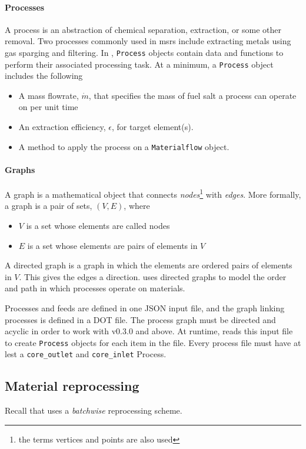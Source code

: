 \paragraph{Processes}
    A process is an abstraction of chemical separation, extraction, or some
    other removal. Two processes commonly used in \Gls{msr}s include
    extracting metals using gas sparging and filtering. In \SaltProc,
    \verb.Process. objects contain data and functions to perform their
    associated processing task. At a minimum, a \verb.Process. object includes
    the following
    \begin{itemize}
        \item A mass flowrate, $\dot{m}$, that specifies the mass of fuel salt a process can operate on per unit time
        \item An extraction efficiency, $\epsilon$, for target element(s).
        \item A method to apply the process on a \verb.Materialflow. object. 
    \end{itemize}

\paragraph{Graphs}
    A graph is a mathematical object that connects {\it nodes}\footnote{the
    terms vertices and points are also used} with {\it edges}. More formally,
    a graph is a pair of sets, $(V, E)$, where
    \begin{itemize}
        \item $V$ is a set whose elements are called nodes
        \item $E$ is a set whose elements are pairs of elements in $V$
    \end{itemize}
    A directed graph is a graph in which the elements are ordered pairs of elements
    in $V$. This gives the edges a direction. \SaltProc uses directed graphs to
    model the order and path in which processes operate on materials.
        
Processes and feeds are defined in one JSON input file, and the graph linking
processes is defined in a DOT file. The process graph must be directed and
acyclic in order to work with \SaltProc v0.3.0 and above. At runtime,
\SaltProc reads this input file to create \verb.Process. objects for each item
in the file. Every process file must have at lest a \verb.core_outlet. and
\verb.core_inlet. Process.

\subsection{Material reprocessing}
Recall that \SaltProc uses a {\it batchwise} reprocessing scheme.

